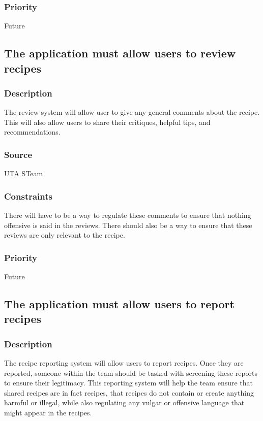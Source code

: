 \subsubsection{Priority}
Future

\subsection{The application must allow users to review recipes}
\subsubsection{Description}
The review system will allow user to give any general comments about the recipe. This will also allow users to share their critiques, helpful tips, and recommendations. 
\subsubsection{Source}
UTA STeam
\subsubsection{Constraints}
There will have to be a way to regulate these comments to ensure that nothing offensive is said in the reviews. There should also be a way to ensure that these reviews are only relevant to the recipe.
\subsubsection{Priority}
Future

\subsection{The application must allow users to report recipes}
\subsubsection{Description}
The recipe reporting system will allow users to report recipes. Once they are reported, someone within the team should be tasked with screening these reports to ensure their legitimacy. This reporting system will help the team ensure that shared recipes are in fact recipes, that recipes do not contain or create anything harmful or illegal, while also regulating any vulgar or offensive language that might appear in the recipes.
